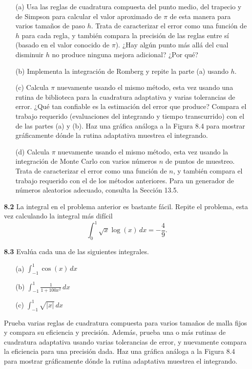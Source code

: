 \documentclass{article}
\begin{document}
\begin{itemize}
    \item[(a)] Usa las reglas de cuadratura compuesta del punto medio, del trapecio y de Simpson para calcular el valor aproximado de \(\pi\) de esta manera para varios tamaños de paso \(h\). Trata de caracterizar el error como una función de \(h\) para cada regla, y también compara la precisión de las reglas entre sí (basado en el valor conocido de \(\pi\)). ¿Hay algún punto más allá del cual disminuir \(h\) no produce ninguna mejora adicional? ¿Por qué?
    \item[(b)] Implementa la integración de Romberg y repite la parte (a) usando \(h\).
    \item[(c)] Calcula \(\pi\) nuevamente usando el mismo método, esta vez usando una rutina de biblioteca para la cuadratura adaptativa y varias tolerancias de error. ¿Qué tan confiable es la estimación del error que produce? Compara el trabajo requerido (evaluaciones del integrando y tiempo transcurrido) con el de las partes (a) y (b). Haz una gráfica análoga a la Figura 8.4 para mostrar gráficamente dónde la rutina adaptativa muestrea el integrando.
    \item[(d)] Calcula \(\pi\) nuevamente usando el mismo método, esta vez usando la integración de Monte Carlo con varios números \(n\) de puntos de muestreo. Trata de caracterizar el error como una función de \(n\), y también compara el trabajo requerido con el de los métodos anteriores. Para un generador de números aleatorios adecuado, consulta la Sección 13.5.
\end{itemize}

\textbf{8.2} La integral en el problema anterior es bastante fácil. Repite el problema, esta vez calculando la integral más difícil
\[
\int_0^1 \sqrt{x} \log(x) \, dx = -\frac{4}{9}.
\]

\textbf{8.3} Evalúa cada una de las siguientes integrales.
\begin{itemize}
    \item[(a)] \(\int_{-1}^1 \cos(x) \, dx\)
    \item[(b)] \(\int_{-1}^1 \frac{1}{1 + 100x^2} \, dx\)
    \item[(c)] \(\int_{-1}^1 \sqrt{|x|} \, dx\)
\end{itemize}

Prueba varias reglas de cuadratura compuesta para varios tamaños de malla fijos y compara su eficiencia y precisión. Además, prueba una o más rutinas de cuadratura adaptativa usando varias tolerancias de error, y nuevamente compara la eficiencia para una precisión dada. Haz una gráfica análoga a la Figura 8.4 para mostrar gráficamente dónde la rutina adaptativa muestrea el integrando.
\end{document}
